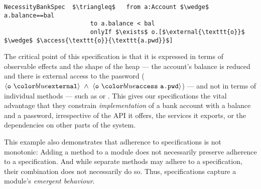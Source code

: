 %
%
%
%
%
%
\begin{lstlisting}[language = Chainmail, mathescape=true, frame=lines]
NecessityBankSpec  $\triangleq$   from a:Account $\wedge$ a.balance==bal
                        to a.balance < bal
                        onlyIf $\exists$ o.[$\external{\texttt{o}}$ $\wedge$ $\access{\texttt{o}}{\texttt{a.pwd}}$]
\end{lstlisting}
%
%
% 
The critical point of this \Nec specification is that it is
expressed in terms of observable effects and the shape of the heap --- the account's balance is reduced 
and there is external access to the password ($\external{\prg{o}}\ \wedge\ \access{\prg{o}}{\prg{a.pwd}}$)
--- and not in terms of individual methods --- such as
 or .
This gives our specifications the
vital advantage that they constrain
\textit{implementation} of a bank account with a balance and a
password, irrespective of the API it
offers, the services it exports, or the dependencies on other parts of
the system.

{This example also demonstrates that 
adherence to   \Nec specifications is not monotonic:
Adding a method to a module does not necessarily preserve adherence to a specification.
And while separate methods may adhere to a  specification, their combination does
not necessarily do so. Thus, \Nec specifications capture a module's \emph{emergent behaviour}. 
}

